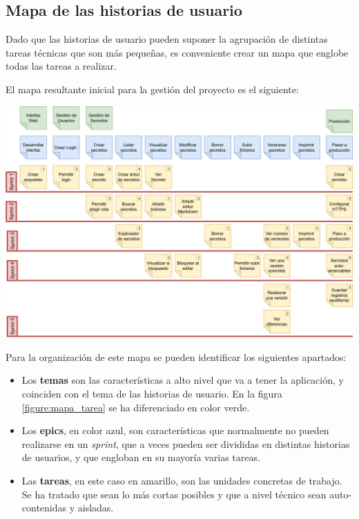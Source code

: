 \documentclass{\ClassPath/viu-tfm-template}
\begin{document}

\subsection{Mapa de las historias de usuario}

Dado que las historias de usuario pueden suponer la agrupación de distintas tareas técnicas que son más pequeñas, es conveniente crear un mapa que englobe todas las tareas a realizar.

El mapa resultante inicial para la gestión del proyecto es el siguiente:
\vspace{-10pt}
\begin{center}
    \includegraphics[width=\linewidth]{img/kanban.png}
    \label{figure:mapa_tarea}
\end{center}

Para la organización de este mapa se pueden identificar los siguientes apartados:
\begin{itemize}
    \item Los \textbf{temas} son las características a alto nivel que va a tener la aplicación, y coinciden con el tema de las historias de usuario. En la figura \ref{figure:mapa_tarea} se ha diferenciado en color verde.
    \item Los \textbf{epics}, en color azul, son características que normalmente no pueden realizarse en un \textit{sprint}, que a veces pueden ser divididas en distintas historias de usuarios, y que engloban en su mayoría varias tareas.
    \item Las \textbf{tareas}, en este caso en amarillo, son las unidades concretas de trabajo. Se ha tratado que sean lo más cortas posibles y que a nivel técnico sean auto-contenidas y aisladas.
\end{itemize}
\end{document}
